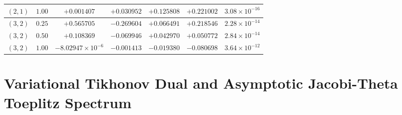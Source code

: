 \documentclass[aps,pra,reprint,nofootinbib,floatfix,longbibliography]{revtex4-2}
\theoremstyle{remark}
\begin{document}
\begin{table}[t]
\begin{ruledtabular}
\begin{tabular}{ccccccc}
$(2,1)$ & $1.00$ & $+0.001407$ & $+0.030952$ & $+0.125808$ & $+0.221002$ & $3.08\times 10^{-16}$ \\
\hline
$(3,2)$ & $0.25$ & $+0.565705$ & $-0.269604$ & $+0.066491$ & $+0.218546$ & $2.28\times 10^{-14}$ \\
$(3,2)$ & $0.50$ & $+0.108369$ & $-0.069946$ & $+0.042970$ & $+0.050772$ & $2.84\times 10^{-14}$ \\
$(3,2)$ & $1.00$ & $-8.02947\times 10^{-6}$ & $-0.001413$ & $-0.019380$ & $-0.080698$ & $3.64\times 10^{-12}$ \\
\end{tabular}
\end{ruledtabular}
\end{table}

\section{Variational Tikhonov Dual and Asymptotic Jacobi-Theta Toeplitz Spectrum}
\label{app:tikhonov_toeplitz}
\end{document}
